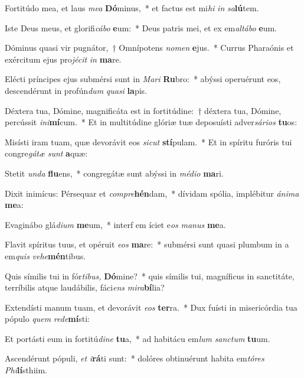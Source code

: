 \item Fortitúdo mea, et laus \textit{mea} \textbf{Dó}minus,~* et factus est mi\textit{hi} \textit{in} \textit{sa}\textbf{lú}tem.
\item Iste Deus meus, et glorifi\textit{cábo} \textbf{e}um:~* Deus patris mei, et ex em\textit{altábo} \textbf{e}um.
\item Dóminus quasi vir pugnátor,~† Omnípotens \textit{nomen} \textbf{e}jus.~* Currus Pharaónis et exércitum ejus pro\textit{jécit} \textit{in} \textbf{ma}re.
\item Elécti príncipes ejus submérsi sunt in \textit{Mari} \textbf{Ru}bro:~* abýssi operuérunt eos, descendérunt in profún\textit{dum} \textit{quasi} \textbf{la}pis.
\item Déxtera tua, Dómine, magnificáta est in fortitúdine:~† déxtera tua, Dómine, percússit \textit{ini}\hspace{-0.01em}\textbf{mí}cum.~* Et in multitúdine glóriæ tuæ deposuísti adver\textit{sários} \textbf{tu}os:
\item Misísti iram tuam, quæ devorávit eos \textit{sic\-ut} \textbf{stí}pulam.~* Et in spíritu furóris tui congre\textit{gátæ} \textit{sunt} \textbf{a}quæ:
\item Stetit \textit{unda} \textbf{flu}ens,~* congregátæ sunt abýssi in \textit{médio} \textbf{ma}ri.
\item Dixit inimícus: Pérsequar et \textit{compre}\textbf{hén}dam,~* dívidam spólia, implébitur \textit{ánima} \textbf{me}a:
\item Evaginábo glá\hspace{0.03em}\textit{dium} \textbf{me}um,~* interf em íciet e\textit{os} \textit{manus} \textbf{me}a.
\item Flavit spíritus tuus, et opéruit \textit{eos} \textbf{ma}re:~* submérsi sunt quasi plumbum in a em\textit{quis} \textit{vehe}\textbf{mén}tibus.
\item Quis símilis tui in fór\textit{tibus,} \textbf{Dó}mine?~* quis símilis tui, magníficus in sanctitáte, terríbilis atque laudábilis, fáci\textit{ens} \textit{mira}\textbf{bí}lia?
\item Extendísti manum tuam, et devorávit \textit{eos} \textbf{ter}ra.~* Dux fuísti in misericórdia tua pópulo \textit{quem} \textit{rede}\textbf{mí}sti:
\item Et portásti eum in fortitú\textit{dine} \textbf{tu}a,~* ad habitácu em\textit{lum} \textit{sanctum} \textbf{tu}um.
\item Ascendérunt pópuli, \textit{et} \textit{i}\textbf{rá}ti sunt:~* dolóres obtinuérunt habita em\textit{tóres} \textit{Phi}\textbf{lí}sthiim.
